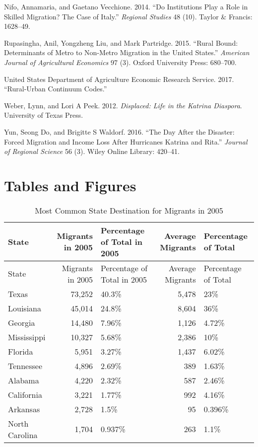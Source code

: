 \documentclass[]{article}
\begin{document}
\hypertarget{ref-nifo2014institutions}{}
Nifo, Annamaria, and Gaetano Vecchione. 2014. ``Do Institutions Play a
Role in Skilled Migration? The Case of Italy.'' \emph{Regional Studies}
48 (10). Taylor \& Francis: 1628--49.

\hypertarget{ref-rupasingha2015rural}{}
Rupasingha, Anil, Yongzheng Liu, and Mark Partridge. 2015. ``Rural
Bound: Determinants of Metro to Non-Metro Migration in the United
States.'' \emph{American Journal of Agricultural Economics} 97 (3).
Oxford University Press: 680--700.

\hypertarget{ref-ersruuc}{}
United States Department of Agriculture Economic Research Service. 2017.
``Rural-Urban Continuum Codes.''

\hypertarget{ref-weber2012displaced}{}
Weber, Lynn, and Lori A Peek. 2012. \emph{Displaced: Life in the Katrina
Diaspora}. University of Texas Press.

\hypertarget{ref-yun2016day}{}
Yun, Seong Do, and Brigitte S Waldorf. 2016. ``The Day After the
Disaster: Forced Migration and Income Loss After Hurricanes Katrina and
Rita.'' \emph{Journal of Regional Science} 56 (3). Wiley Online Library:
420--41.

\clearpage

\section{Tables and Figures}\label{tables-and-figures}

\begin{longtable}[]{@{}lrlrl@{}}
\caption{Most Common State Destination for Migrants in 2005
\label{tab:commondeststate}}\tabularnewline
\toprule
State & Migrants in 2005 & Percentage of Total in 2005 & Average
Migrants & Percentage of Total\tabularnewline
\midrule
\endfirsthead
\toprule
State & Migrants in 2005 & Percentage of Total in 2005 & Average
Migrants & Percentage of Total\tabularnewline
\midrule
\endhead
Texas & 73,252 & 40.3\% & 5,478 & 23\%\tabularnewline
Louisiana & 45,014 & 24.8\% & 8,604 & 36\%\tabularnewline
Georgia & 14,480 & 7.96\% & 1,126 & 4.72\%\tabularnewline
Mississippi & 10,327 & 5.68\% & 2,386 & 10\%\tabularnewline
Florida & 5,951 & 3.27\% & 1,437 & 6.02\%\tabularnewline
Tennessee & 4,896 & 2.69\% & 389 & 1.63\%\tabularnewline
Alabama & 4,220 & 2.32\% & 587 & 2.46\%\tabularnewline
California & 3,221 & 1.77\% & 992 & 4.16\%\tabularnewline
Arkansas & 2,728 & 1.5\% & 95 & 0.396\%\tabularnewline
North Carolina & 1,704 & 0.937\% & 263 & 1.1\%\tabularnewline
\bottomrule
\end{longtable}
\end{document}

